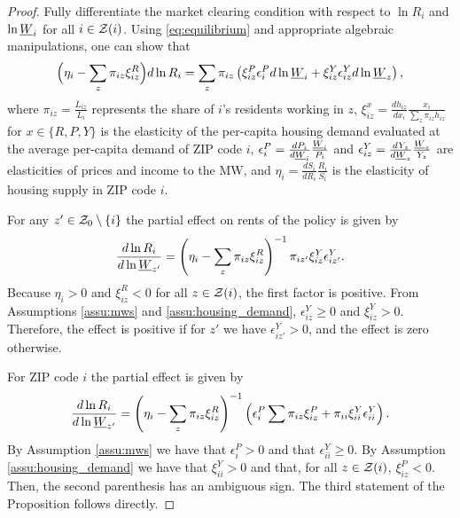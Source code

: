 \begin{proof}
    Fully differentiate the market clearing condition with respect to $\ln R_i$ 
    and $\ln \underline{W}_i$ for all $i\in\mathcal{Z}(i)$.
    Using \eqref{eq:equilibrium} and appropriate algebraic manipulations, 
    one can show that
    \begin{equation}\label{eq:diff_equilibrium}
        \Big(\eta_i - \sum_z \pi_{iz} \xi^R_{iz} \Big) d \ln R_i
        = 
        \sum_z \pi_{iz} \left(\xi^P_{iz} \epsilon_{i}^P d \ln \underline{W}_i 
                            + \xi^Y_{iz} \epsilon_{iz}^Y d \ln \underline{W}_z \right) ,
    \end{equation}
    where
    $\pi_{iz} = \frac{L_{iz}}{L_i}$ represents the share of $i$'s residents 
    working in $z$,
    $\xi_{iz}^x = \frac{d h_{iz}}{d x_i} \frac{x_i}{\sum_z \pi_{iz} h_{iz}}$ for
    $x\in\{R,P,Y\}$ is the elasticity of the per-capita housing demand evaluated 
    at the average per-capita demand of ZIP code $i$,
    $\epsilon_{i}^P = \frac{d P_i}{d \underline{W}_i} \frac{\underline{W}_i}{P_i}$ and 
    $\epsilon_{iz}^Y = \frac{d Y_z}{d \underline{W}_z} \frac{\underline{W}_z}{Y_z}$ are
    elasticities of prices and income to the MW, and
    $\eta_i = \frac{d S_i}{d R_i} \frac{R_i}{S_i}$ is the elasticity 
    of housing supply in ZIP code $i$.

    For any $z'\in\mathcal{Z}_0\setminus\{i\}$ the partial effect on rents of the policy
    is given by
    $$
    \frac{d\ln R_i}{d\ln\underline{W}_{z'}} 
      = \left(\eta_i - \sum_z \pi_{iz} \xi^R_{iz}\right)^{-1} 
              \pi_{iz'}\xi^Y_{iz}\epsilon_{iz'}^Y.
    $$
    Because $\eta_i>0$ and $\xi^R_{iz} < 0$ for all $z\in\mathcal{Z}(i)$, 
    the first factor is positive.
    From Assumptions \ref{assu:mws} and \ref{assu:housing_demand},
    $\epsilon_{iz}^Y\geq0$ and $\xi^Y_{iz}>0$.
    Therefore, the effect is positive if for $z'$ we have $\epsilon_{iz'}^Y>0$, 
    and the effect is zero otherwise.

    For ZIP code $i$ the partial effect is given by
    $$
    \frac{d\ln R_i}{d\ln\underline{W}_{z'}} 
      = \left(\eta_i - \sum_z \pi_{iz} \xi^R_{iz}\right)^{-1} 
        \left(\epsilon_{i}^P \sum \pi_{iz}\xi^P_{iz} 
             + \pi_{ii}\xi^Y_{ii}\epsilon_{ii}^Y \right) .
    $$
    By Assumption \ref{assu:mws} we have that $\epsilon_{i}^P>0$ and that 
    $\epsilon_{ii}^Y\geq0$.
    By Assumption \ref{assu:housing_demand} we have that $\xi^Y_{ii}>0$ and that, 
    for all $z\in\mathcal{Z}(i)$, $\xi^P_{iz}<0$.
    Then, the second parenthesis has an ambiguous sign.
    The third statement of the Proposition follows directly.
\end{proof}

